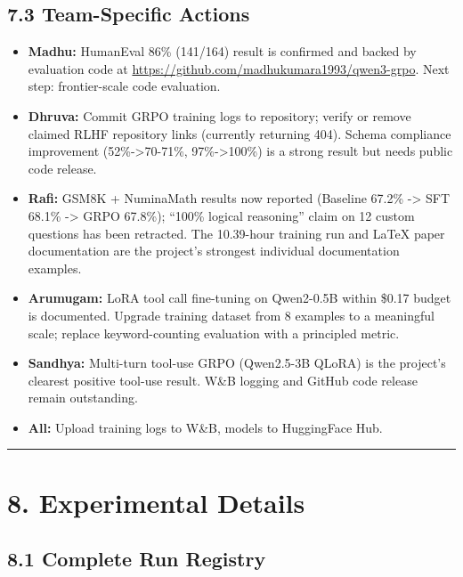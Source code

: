 \documentclass[
  american,
  11pt,
  a4paper,
  oneside]{report}
\providecommand{\tightlist}{%
  \setlength{\itemsep}{0pt}\setlength{\parskip}{0pt}}
\begin{document}
\section{7.3 Team-Specific Actions}\label{team-specific-actions}

\begin{itemize}
\tightlist
\item
  \textbf{Madhu:} HumanEval 86\% (141/164) result is confirmed and
  backed by evaluation code at
  \url{https://github.com/madhukumara1993/qwen3-grpo}. Next step:
  frontier-scale code evaluation.
\item
  \textbf{Dhruva:} Commit GRPO training logs to repository; verify or
  remove claimed RLHF repository links (currently returning 404). Schema
  compliance improvement (52\%-\textgreater70-71\%,
  97\%-\textgreater100\%) is a strong result but needs public code
  release.
\item
  \textbf{Rafi:} GSM8K + NuminaMath results now reported (Baseline
  67.2\% -\textgreater{} SFT 68.1\% -\textgreater{} GRPO 67.8\%);
  ``100\% logical reasoning'' claim on 12 custom questions has been
  retracted. The 10.39-hour training run and LaTeX paper documentation
  are the project's strongest individual documentation examples.
\item
  \textbf{Arumugam:} LoRA tool call fine-tuning on Qwen2-0.5B within
  \$0.17 budget is documented. Upgrade training dataset from 8 examples
  to a meaningful scale; replace keyword-counting evaluation with a
  principled metric.
\item
  \textbf{Sandhya:} Multi-turn tool-use GRPO (Qwen2.5-3B QLoRA) is the
  project's clearest positive tool-use result. W\&B logging and GitHub
  code release remain outstanding.
\item
  \textbf{All:} Upload training logs to W\&B, models to HuggingFace Hub.
\end{itemize}

\begin{center}\rule{0.5\linewidth}{0.5pt}\end{center}

\chapter{8. Experimental Details}\label{experimental-details}

\section{8.1 Complete Run Registry}\label{complete-run-registry}
\end{document}

